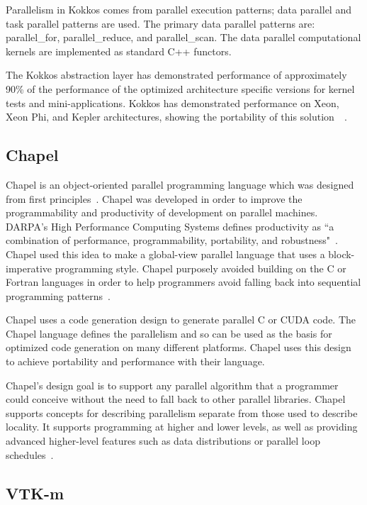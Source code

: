 Parallelism in Kokkos comes from parallel execution patterns; data parallel and task parallel patterns are used.
%
The primary data parallel patterns are: parallel\_for, parallel\_reduce, and parallel\_scan.
%
The data parallel computational kernels are implemented as standard C++ functors.
%

The Kokkos abstraction layer has demonstrated performance of approximately 90\% of the performance of the optimized architecture specific versions for kernel tests and mini-applications.
%
Kokkos has demonstrated performance on Xeon, Xeon Phi, and Kepler architectures, showing the portability of this solution~\cite{edwards2014kokkos}~\cite{edwards2012manycore}.

\subsection*{\textbf{Chapel}}

Chapel is an object-oriented parallel programming language which was designed from first principles~\cite{sidelnik2012performance}.
%
Chapel was developed in order to improve the programmability and productivity of development on parallel machines.
%
DARPA's High Performance Computing Systems defines productivity as ``a combination of performance, programmability, portability, and robustness"~\cite{chamberlain2007parallel}.
%
Chapel used this idea to make a global-view parallel language that uses a block-imperative programming style.
%
Chapel purposely avoided building on the C or Fortran languages in order to help programmers avoid falling back into sequential programming patterns~\cite{chamberlain2007parallel}.

Chapel uses a code generation design to generate parallel C or CUDA code.
%
The Chapel language defines the parallelism and so can be used as the basis for optimized code generation on many different platforms.
%
Chapel uses this design to achieve portability and performance with their language.

Chapel's design goal is to support any parallel algorithm that a programmer could conceive without the need to fall back to other parallel libraries.
%
Chapel supports concepts for describing parallelism separate from those used to describe locality.
%
It supports programming at higher and lower levels, as well as providing advanced higher-level features such as data distributions or parallel loop schedules~\cite{bradchamberlain2013}.


\subsection*{\textbf{VTK-m}}

